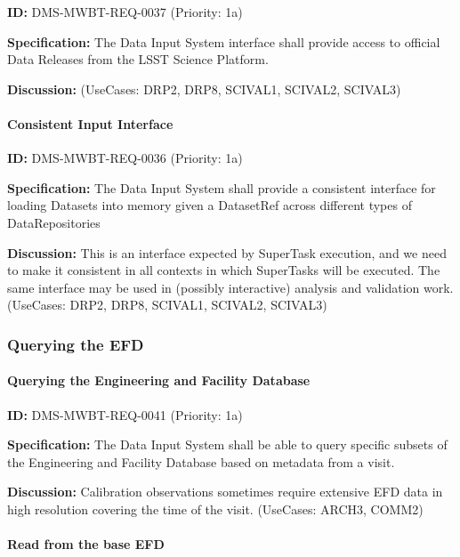 \documentclass[SE,toc,lsstdraft]{lsstdoc}
\begin{document}
\label{DMS-MWBT-REQ-0037}
\textbf{ID:} DMS-MWBT-REQ-0037 (Priority: 1a)

\textbf{Specification:}
The Data Input System interface shall provide access to official Data Releases from the LSST Science Platform.

\textbf{Discussion:}
(UseCases: DRP2, DRP8, SCIVAL1, SCIVAL2, SCIVAL3)

\paragraph{Consistent Input Interface}\hfill  %

\label{DMS-MWBT-REQ-0036}
\textbf{ID:} DMS-MWBT-REQ-0036 (Priority: 1a)

\textbf{Specification:}
The Data Input System shall provide a consistent interface for loading Datasets into memory given a DatasetRef across different types of DataRepositories

\textbf{Discussion:}
This is an interface expected by SuperTask execution, and we need to make it consistent in all contexts in which SuperTasks will be executed. The same interface may be used in (possibly interactive) analysis and validation work. (UseCases: DRP2, DRP8, SCIVAL1, SCIVAL2, SCIVAL3)

\subsubsection{Querying the EFD}

\paragraph{Querying the Engineering and Facility Database}\hfill  %

\label{DMS-MWBT-REQ-0041}
\textbf{ID:} DMS-MWBT-REQ-0041 (Priority: 1a)

\textbf{Specification:}
The Data Input System shall be able to query specific subsets of the Engineering and Facility Database based on metadata from a visit.

\textbf{Discussion:}
Calibration observations sometimes require extensive EFD data in high resolution covering the time of the visit. (UseCases: ARCH3, COMM2)

\paragraph{Read from the base EFD}\hfill  %
\end{document}
